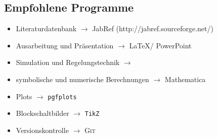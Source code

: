 \subsection*{Empfohlene Programme}
\label{sec:Empfohlene Programme}
\begin{itemize}
	\item Literaturdatenbank $\rightarrow$ JabRef (http://jabref.sourceforge.net/)
	\item Ausarbeitung und Präsentation $\rightarrow$ \LaTeX / PowerPoint
	\item Simulation und Regelungstechnik $\rightarrow$ \MatSim
	\item symbolische und numerische Berechnungen $\rightarrow$ Mathematica
	\item Plots $\rightarrow$ \texttt{pgfplots}
	\item Blockschaltbilder $\rightarrow$ \texttt{TikZ}
	\item Versionskontrolle $\rightarrow$ \textsc{Git}
\end{itemize}
